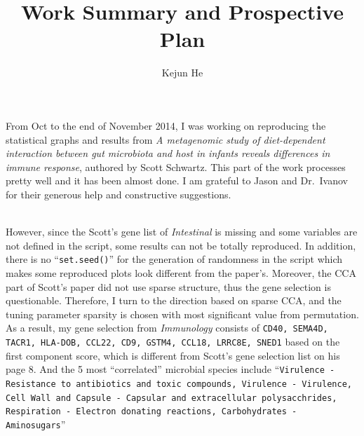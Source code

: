 \documentclass[12pt]{article}\usepackage[]{graphicx}\usepackage[]{color}
\begin{document}
  \title{Work Summary and Prospective Plan}
  \author{Kejun He}
  \date{}

  \maketitle
  
  From Oct to the end of November 2014, I was working on reproducing the statistical graphs and results from \textit{A metagenomic study of diet-dependent interaction between gut microbiota and host in infants reveals differences in immune response}, authored by Scott Schwartz. This part of the work processes pretty well and it has been almost done. I am grateful to Jason and Dr.~Ivanov for their generous help and constructive suggestions.   \\ $ $ \par
However, since the Scott's gene list of \textit{Intestinal} is missing and some variables are not defined in the script, some results can not be totally reproduced. In addition, there is no ``\texttt{set.seed()}'' for the generation of randomness in the script which makes some reproduced plots look different from the paper's. Moreover, the CCA part of Scott's paper did not use sparse structure, thus the gene selection is questionable. Therefore, I turn to the direction based on sparse CCA, and the tuning parameter sparsity is chosen with most significant value from permutation. As a result, my gene selection from \textit{Immunology} consists of \texttt{CD40, SEMA4D, TACR1, HLA-DOB, CCL22, CD9, GSTM4, CCL18, LRRC8E, SNED1} based on the first component score, which is different from Scott's gene selection list on his page 8. And the 5 most ``correlated'' microbial species include ``\texttt{Virulence - Resistance to antibiotics and toxic compounds, Virulence - Virulence, Cell Wall and Capsule - Capsular and extracellular polysacchrides, Respiration - Electron donating reactions, Carbohydrates - Aminosugars}''
\end{document}
